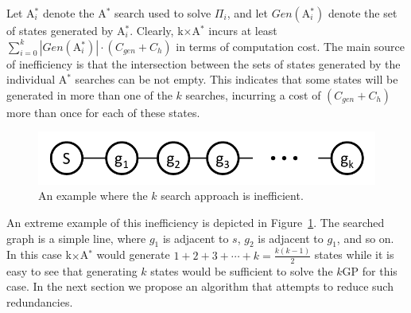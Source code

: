 \documentclass{aicom2e}
\newcommand{\kgs}{$k$GP}
\newcommand{\astar}{A$^*$}
\newcommand{\kxastar}{k$\times$A$^*$}
\newcommand{\astari}[1]{A$^*_#1$}
\newcommand{\open}{\textsc{Open}}
\begin{document}

Let \astari{i} denote   the \astar{} search used to solve $\Pi_i$, and let
$Gen(\text{\astari{i}})$ denote the set of states generated by \astari{i}.
Clearly, \kxastar{} incurs at least $\sum_{i=0}^k
|Gen(\text{\astari{i}})|\cdot(C_{gen}+C_{h})$ in terms of computation cost. The
main source of inefficiency is that the intersection between the sets of states
generated by the individual \astar{} searches can be not empty. This indicates
that some states will be generated in more than one of the $k$ searches, 
incurring a cost of $(C_{gen}+C_{h})$ more than once for each of these states.

\begin{figure}
    \includegraphics[width=\columnwidth]{k-search-bad_cropped}
    \caption{An example where the $k$ search approach is inefficient.}
    \label{fig:k-search-bad}
\end{figure}
An extreme example of this inefficiency is depicted in
Figure~\ref{fig:k-search-bad}. The searched graph is a simple line, where $g_1$ is adjacent to $s$,
$g_2$ is adjacent to $g_1$, and so on. In this case \kxastar{} would generate
$1+2+3+\cdots+k=\frac{k(k-1)}{2}$ states while it is easy to see that
generating $k$ states would be sufficient to solve the \kgs{} for this case.
In the next section we propose an algorithm that attempts to reduce such redundancies. %


\end{document}
